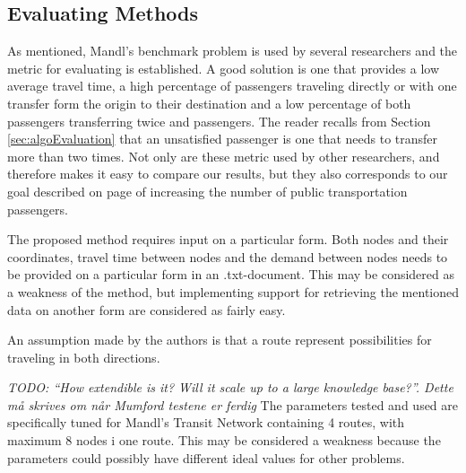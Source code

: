 \subsection{Evaluating Methods}

As mentioned, Mandl's benchmark problem is used by several researchers and the metric for evaluating is established. A good solution is one that provides a low average travel time, a high percentage of passengers traveling directly or with one transfer form the origin to their destination and a low percentage of both passengers transferring twice and  passengers. The reader recalls from Section \vref{sec:algoEvaluation} that an unsatisfied passenger is one that needs to transfer more than two times. Not only are these metric used by other researchers, and therefore makes it easy to compare our results, but they also corresponds to our goal described on page \pageref{itm:goal} of increasing  the number of public transportation passengers. 

The proposed method requires input on a particular form. Both nodes and their coordinates, travel time between nodes and the demand between nodes needs to be provided on a particular form in an .txt-document. This may be considered as a weakness of the method, but implementing support for retrieving the mentioned data on another form are considered as fairly easy. 

An assumption made by the authors is that a route represent possibilities for traveling in both directions. 

\emph{\color{blue} TODO: ``How extendible is it? Will it scale up to a large knowledge base?''. Dette må skrives om når Mumford testene er ferdig}
The parameters tested and used are specifically tuned for Mandl's Transit Network containing 4 routes, with maximum 8 nodes i one route. This may be considered a weakness because the parameters could possibly have different ideal values for other problems. 


